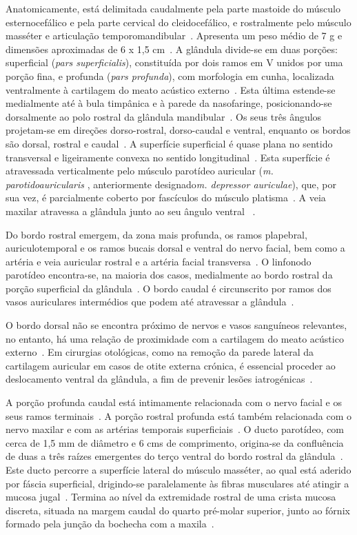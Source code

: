 Anatomicamente, está delimitada caudalmente pela parte mastoide do músculo esternocefálico e pela parte cervical do cleidocefálico, e rostralmente pelo músculo masséter e articulação temporomandibular~\cite{Singh2017}. Apresenta um peso médio de 7 g e dimensões aproximadas de 6 x 1,5 cm~\cite{Singh2017}.
A glândula divide-se em duas porções: superficial (\textit{pars superficialis}), constituída por dois ramos em V unidos por uma porção fina, e profunda (\textit{pars profunda}), com morfologia em cunha, localizada ventralmente à cartilagem do meato acústico externo~\cite{Singh2017}. Esta última estende-se medialmente até à bula timpânica e à parede da nasofaringe, posicionando-se dorsalmente ao polo rostral da glândula mandibular~\cite{Singh2017}.
Os seus três ângulos projetam-se em direções dorso-rostral, dorso-caudal e ventral, enquanto os bordos são dorsal, rostral e caudal~\cite{Singh2017}. A superfície superficial  é quase plana no sentido transversal e ligeiramente convexa no sentido longitudinal~\cite{Singh2017}. Esta superfície é atravessada verticalmente pelo músculo parotídeo auricular (\textit{m. parotidoauricularis} , anteriormente designado\textit{m. depressor auriculae}), que, por sua vez, é parcialmente coberto por fascículos do músculo platisma~\cite{Singh2017}. A veia maxilar atravessa a glândula junto ao seu ângulo ventral~\cite{Singh2017}
.

Do bordo rostral emergem, da zona mais profunda, os ramos plapebral, auriculotemporal e os ramos bucais dorsal e ventral do nervo facial, bem como a artéria e veia auricular rostral e a artéria facial transversa~\cite{Singh2017}. O linfonodo parotídeo encontra-se, na maioria dos casos, medialmente ao bordo rostral da porção superficial da glândula~\cite{Singh2017}. O bordo caudal é circunscrito por ramos dos vasos auriculares intermédios que podem até atravessar a glândula~\cite{Singh2017}.


O bordo dorsal não se encontra próximo de nervos e vasos sanguíneos relevantes, no entanto, há uma relação de proximidade com a cartilagem do meato acústico externo~\cite{Singh2017}. Em cirurgias otológicas, como na remoção da parede lateral da cartilagem auricular em casos de otite externa crónica, é essencial proceder ao deslocamento ventral da glândula, a fim de prevenir lesões iatrogénicas~\cite{Singh2017}. 


A porção profunda caudal está intimamente relacionada com o nervo facial e os seus ramos terminais~\cite{Singh2017}. A porção rostral profunda está também relacionada com o nervo maxilar e com as artérias temporais superficiais~\cite{Singh2017}.
O ducto parotídeo, com cerca de 1,5 mm  de diâmetro e 6 cms de comprimento, origina-se da confluência de duas a três raízes emergentes do terço ventral do bordo rostral da glândula~\cite{Singh2017}. Este ducto percorre a superfície lateral do músculo masséter, ao qual está aderido por fáscia superficial, drigindo-se paralelamente às fibras musculares até atingir a mucosa jugal~\cite{Singh2017}. Termina ao nível da extremidade rostral de uma crista mucosa discreta, situada na margem caudal do quarto pré-molar superior, junto ao fórnix formado pela junção da bochecha com a maxila~\cite{Singh2017}.


